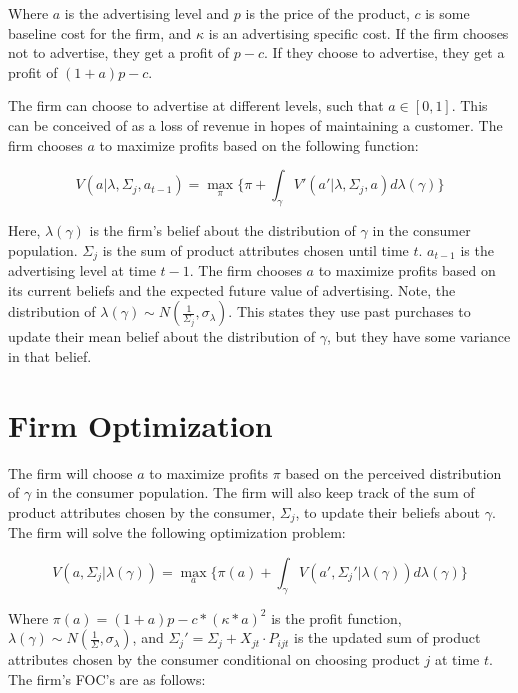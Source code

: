 \documentclass[11pt]{article}
\theoremstyle{definition}
\theoremstyle{remark}
\begin{document}
Where $a$ is the advertising level and $p$ is the price of the product, $c$ is some baseline cost for the firm, and $\kappa$ is an advertising specific cost. If the firm chooses not to advertise, they get a profit of $p-c$. If they choose to advertise, they get a profit of $(1+a)p - c$.

The firm can choose to advertise at different levels, such that $a\in [0,1]$. This can be conceived of as a loss of revenue in hopes of maintaining a customer. The firm chooses $a$ to maximize profits based on the following function:

\begin{equation}
  V(a|\lambda, \Sigma_j, a_{t-1}) = \max_{\pi} \{\pi + \int_{\gamma} V'(a'|\lambda, \Sigma_j, a) d\lambda(\gamma)\}
\end{equation}

Here, $\lambda(\gamma)$ is the firm's belief about the distribution of $\gamma$ in the consumer population. $\Sigma_j$ is the sum of product attributes chosen until time $t$. $a_{t-1}$ is the advertising level at time $t-1$.
The firm chooses $a$ to maximize profits based on its current beliefs and the expected future value of advertising. Note, the distribution of $\lambda(\gamma) \sim N(\frac{1}{\Sigma_j}, \sigma_{\lambda})$.
This states they use past purchases to update their mean belief about the distribution of $\gamma$, but they have some variance in that belief.

\section{Firm Optimization}

The firm will choose $a$ to maximize profits $\pi$ based on the perceived distribution of $\gamma$ in the consumer population. The firm will also keep track of the sum of product attributes chosen by the consumer, $\Sigma_j$, to update their beliefs about $\gamma$.
The firm will solve the following optimization problem:

\begin{equation}
  V(a, \Sigma_j | \lambda(\gamma)) = \max_{a} \{\pi(a) + \int_{\gamma} V(a', \Sigma_j' | \lambda(\gamma)) d\lambda(\gamma)\}
\end{equation}

Where $\pi(a) = (1 + a)p - c*(\kappa*a)^2$ is the profit function, $\lambda(\gamma) \sim N(\frac{1}{\Sigma}, \sigma_{\lambda})$, and $\Sigma_j' = \Sigma_j + X_{jt}\cdot P_{ijt}$ is the updated sum of product attributes chosen by the consumer conditional on choosing product $j$ at time $t$.
The firm's FOC's are as follows:
\end{document}
